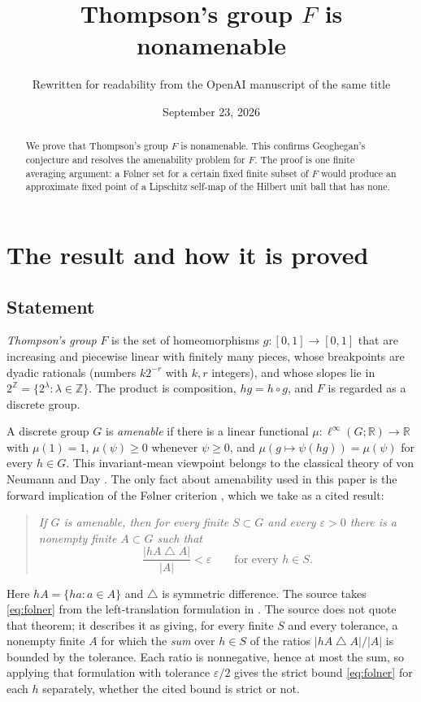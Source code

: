 \documentclass[11pt]{article}
\title{Thompson's group \(F\) is nonamenable}
\author{Rewritten for readability from the OpenAI manuscript of the same title}
\date{September 23, 2026}
\newcommand{\R}{\mathbb R}
\newcommand{\Z}{\mathbb Z}
\theoremstyle{definition}
\numberwithin{equation}{section}
\begin{document}
\maketitle
\begin{abstract}
We prove that Thompson's group \(F\) is nonamenable. This confirms
Geoghegan's conjecture and resolves the amenability problem for \(F\).
The proof is one finite averaging argument: a F\o lner set for a certain
fixed finite subset of \(F\) would produce an approximate fixed point of a
Lipschitz self-map of the Hilbert unit ball that has none.
\end{abstract}

\section{The result and how it is proved}\label{sec:introduction}

\subsection{Statement}

\emph{Thompson's group} \(F\) is the set of homeomorphisms
\(g:[0,1]\to[0,1]\) that are increasing and piecewise linear with finitely
many pieces, whose breakpoints are dyadic rationals (numbers \(k2^{-r}\)
with \(k,r\) integers), and whose slopes lie in
\(2^{\Z}=\{2^{\lambda}:\lambda\in\Z\}\). The product is composition,
\(hg=h\circ g\), and \(F\) is regarded as a discrete group.

A discrete group \(G\) is \emph{amenable} if there is a linear functional
\(\mu:\ell^\infty(G;\R)\to\R\) with \(\mu(1)=1\), \(\mu(\psi)\ge0\) whenever
\(\psi\ge0\), and \(\mu(g\mapsto\psi(hg))=\mu(\psi)\) for every \(h\in G\).
This invariant-mean viewpoint belongs to the classical theory of von Neumann
and Day \cite{vonNeumann1929,Day1957}. The only fact about amenability used
in this paper is the forward implication of the F\o lner criterion
\cite{Folner1955}, which we take as a cited result:

\begin{quote}
\emph{If \(G\) is amenable, then for every finite \(S\subset G\) and every
\(\varepsilon>0\) there is a nonempty finite \(A\subset G\) such that}
\begin{equation}\label{eq:folner}
  \frac{|hA\mathbin{\triangle}A|}{|A|}<\varepsilon
  \qquad\text{for every } h\in S .
\end{equation}
\end{quote}
Here \(hA=\{ha:a\in A\}\) and \(\triangle\) is symmetric difference. The
source takes \eqref{eq:folner} from the left-translation formulation in
\cite[Theorem~1.2]{Moore2013}. The source does not quote that theorem; it
describes it as giving, for every finite \(S\) and every tolerance, a nonempty
finite \(A\) for which the \emph{sum} over \(h\in S\) of the ratios
\(|hA\mathbin{\triangle}A|/|A|\) is bounded by the tolerance. Each ratio is
nonnegative, hence at most the sum, so applying that formulation with
tolerance \(\varepsilon/2\) gives the strict bound \eqref{eq:folner} for each
\(h\) separately, whether the cited bound is strict or not.
\end{document}
